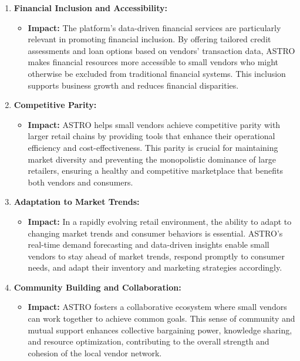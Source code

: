 \begin{enumerate}
		\item \textbf{Financial Inclusion and Accessibility:}
		\begin{itemize}
			\item \textbf{Impact:} The platform’s data-driven financial services are particularly relevant in promoting financial inclusion. By offering tailored credit assessments and loan options based on vendors’ transaction data, ASTRO makes financial resources more accessible to small vendors who might otherwise be excluded from traditional financial systems. This inclusion supports business growth and reduces financial disparities.
		\end{itemize}
		
		\item \textbf{Competitive Parity:}
		\begin{itemize}
			\item \textbf{Impact:} ASTRO helps small vendors achieve competitive parity with larger retail chains by providing tools that enhance their operational efficiency and cost-effectiveness. This parity is crucial for maintaining market diversity and preventing the monopolistic dominance of large retailers, ensuring a healthy and competitive marketplace that benefits both vendors and consumers.
		\end{itemize}
		
		\item \textbf{Adaptation to Market Trends:}
		\begin{itemize}
			\item \textbf{Impact:} In a rapidly evolving retail environment, the ability to adapt to changing market trends and consumer behaviors is essential. ASTRO’s real-time demand forecasting and data-driven insights enable small vendors to stay ahead of market trends, respond promptly to consumer needs, and adapt their inventory and marketing strategies accordingly.
		\end{itemize}
		
		\item \textbf{Community Building and Collaboration:}
		\begin{itemize}
			\item \textbf{Impact:} ASTRO fosters a collaborative ecosystem where small vendors can work together to achieve common goals. This sense of community and mutual support enhances collective bargaining power, knowledge sharing, and resource optimization, contributing to the overall strength and cohesion of the local vendor network.
		\end{itemize}
		

\end{enumerate}
